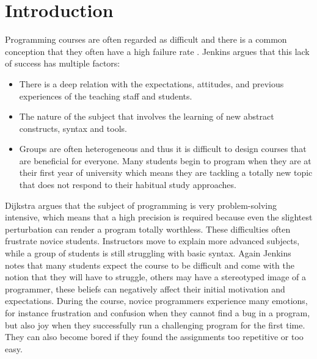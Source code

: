 \documentclass[a4paper,twoside]{article}
\begin{document}
\onecolumn \maketitle \normalsize \vfill

\section{Introduction}
Programming courses are often regarded as difficult
\cite{robins2003learning, lahtinen2005study}
and there is a common conception that they often have a high
failure rate \cite{bennedsen2007failure}.
Jenkins \cite{jenkins2001motivation} argues that this lack of success has
multiple factors:
\begin{itemize}
\item There is a deep relation with the expectations, attitudes,
and previous experiences of the teaching staff and students.
\item The nature of the subject that involves the
learning of new abstract constructs, syntax and tools.
\item Groups are often heterogeneous and thus it is difficult to design courses
that are beneficial for everyone. Many students begin to program when they
are at their first year of university which means they are tackling a totally
new topic that does not respond to their habitual study approaches.
\end{itemize}

Dijkstra \cite{dijkstra1989cruelty} argues that the subject of programming is
very problem-solving intensive, which means that a high precision is required
because even the slightest perturbation can render a program totally worthless.
These difficulties often frustrate novice students. Instructors move to explain
more advanced subjects, while a group of students is still struggling with
basic syntax.
Again Jenkins \cite{jenkins2001motivation, jenkins2002difficulty} notes that
many students expect the course to be difficult and come with the notion that
they will have to struggle, others may have a stereotyped image of a programmer,
these beliefs can negatively affect their initial motivation and expectations.
During the course, novice programmers experience many emotions,
for instance frustration and
confusion when they cannot find a bug in a program, but also joy when they
successfully run a challenging program for the first time. They can also become
bored if they found the assignments too repetitive or too easy.
\end{document}
